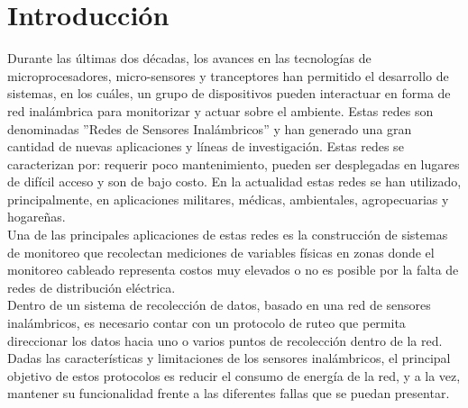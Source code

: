 \chapter{Introducción}
Durante las últimas dos décadas, los avances en las tecnologías de microprocesadores, micro-sensores y tranceptores han permitido el desarrollo de sistemas, en los cuáles, un grupo de dispositivos pueden interactuar en forma de red inalámbrica para monitorizar y actuar sobre el ambiente. Estas redes son denominadas ''Redes de Sensores Inalámbricos'' y han generado una gran cantidad de nuevas aplicaciones y líneas de investigación. Estas redes se caracterizan por: requerir poco mantenimiento, pueden ser desplegadas en lugares de difícil acceso y son de bajo costo. En la actualidad estas redes se han utilizado, principalmente, en aplicaciones militares, médicas, ambientales, agropecuarias y hogareñas.\\

Una de las principales aplicaciones de estas redes es la construcción de sistemas de monitoreo que recolectan mediciones de variables físicas en zonas donde el monitoreo cableado representa costos muy elevados o no es posible por la falta de redes de distribución eléctrica\cite{WileyWSN}.\\

Dentro de un sistema de recolección de datos, basado en una red de sensores inalámbricos, es necesario contar con un protocolo de ruteo que permita direccionar los datos hacia uno o varios puntos de recolección dentro de la red. Dadas las características y limitaciones de los sensores inalámbricos, el principal objetivo de estos protocolos es reducir el consumo de energía de la red, y a la vez, mantener su funcionalidad frente a las diferentes fallas que se puedan presentar\cite{WSNSurvey}.\\

